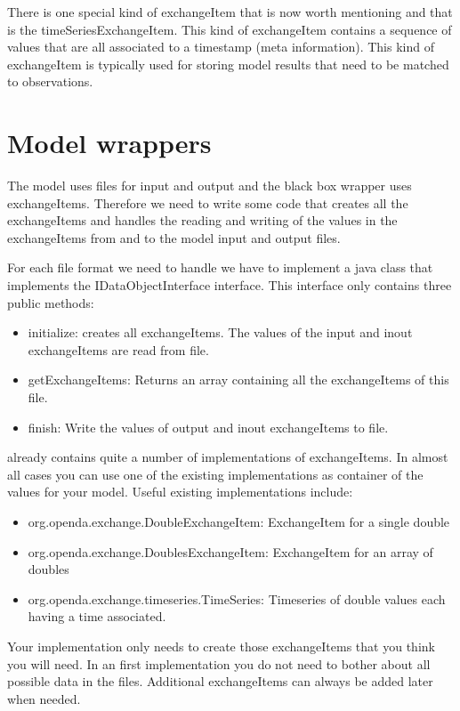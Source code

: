 There is one special kind of exchangeItem that is now worth mentioning and that
is the timeSeriesExchangeItem. This kind of exchangeItem contains a sequence of
values that are all associated to a timestamp (meta information). This kind of
exchangeItem is typically used for storing model results that need to be
matched to observations.

\section{Model wrappers}
The model uses files for input and output and the black box wrapper uses
exchangeItems. Therefore we need to write some code that creates all the
exchangeItems and handles the reading and writing of the values in the
exchangeItems from and to the model input and output files.

For each file format we need to handle we have to implement a java class that
implements the IDataObjectInterface interface. This interface only contains three
public methods:
\begin{itemize}
\item initialize: creates all exchangeItems. The values of the input and inout
  exchangeItems are read from file.
\item getExchangeItems: Returns an array containing all the exchangeItems of
  this file.
\item finish: Write the values of output and inout exchangeItems to file.
\end{itemize}

\oda already contains quite a number of implementations of exchangeItems. In
almost all cases you can use one of the existing implementations as container
of the values for your model. Useful existing implementations include:
\begin{itemize}
\item org.openda.exchange.DoubleExchangeItem: ExchangeItem for a single double
\item org.openda.exchange.DoublesExchangeItem: ExchangeItem for an array of
  doubles
\item org.openda.exchange.timeseries.TimeSeries: Timeseries of double values
  each having a time associated.
\end{itemize}

Your implementation only needs to create those exchangeItems that you think you
will need. In an first implementation you do not need to bother about all
possible data in the files. Additional exchangeItems can always be added later
when needed.

